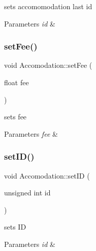 sets accomomodation last id 


\begin{DoxyParams}{Parameters}
{\em id} & \\
\hline
\end{DoxyParams}
\hypertarget{class_accomodation_a9fc9164c6a0a353538e422ec36db43f4}{}\label{class_accomodation_a9fc9164c6a0a353538e422ec36db43f4} 
\subsubsection{\texorpdfstring{set\+Fee()}{setFee()}}
{\footnotesize\ttfamily void Accomodation\+::set\+Fee (\begin{DoxyParamCaption}\item[{float}]{fee }\end{DoxyParamCaption})\hspace{0.3cm}{\ttfamily [inline]}}



sets fee 


\begin{DoxyParams}{Parameters}
{\em fee} & \\
\hline
\end{DoxyParams}
\hypertarget{class_accomodation_a3d06b872d484b5aa2455d65d98b63645}{}\label{class_accomodation_a3d06b872d484b5aa2455d65d98b63645} 
\subsubsection{\texorpdfstring{set\+I\+D()}{setID()}}
{\footnotesize\ttfamily void Accomodation\+::set\+ID (\begin{DoxyParamCaption}\item[{unsigned int}]{id }\end{DoxyParamCaption})\hspace{0.3cm}{\ttfamily [inline]}}



sets ID 


\begin{DoxyParams}{Parameters}
{\em id} & \\
\hline
\end{DoxyParams}
\hypertarget{class_accomodation_a6801983a50d805b975b50950c22f8c61}{}\label{class_accomodation_a6801983a50d805b975b50950c22f8c61} 
